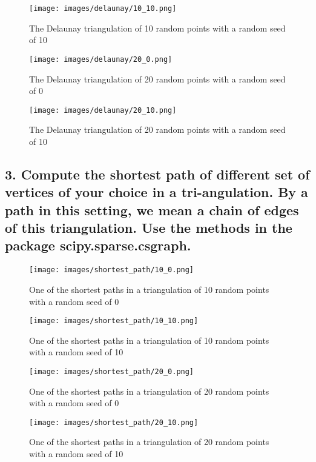 \documentclass[12pt]{article}
\newenvironment{matlab}
	{\begin{figure}[H]\centering\captionsetup{justification=centering}}
	{\end{figure}}
\begin{document}
\begin{matlab}
    \texttt{[image: images/delaunay/10\_10.png]}
    \caption{The Delaunay triangulation of 10 random points with a random seed of 10}
\end{matlab}

\begin{matlab}
    \texttt{[image: images/delaunay/20\_0.png]}
    \caption{The Delaunay triangulation of 20 random points with a random seed of 0}
\end{matlab}

\begin{matlab}
    \texttt{[image: images/delaunay/20\_10.png]}
    \caption{The Delaunay triangulation of 20 random points with a random seed of 10}
\end{matlab}

\pagebreak

\subsection*{3. Compute the shortest path of different set of vertices of your choice in a tri-angulation. By a path in this setting, we mean a chain of edges of this triangulation. Use the
methods in the package \textbf{scipy.sparse.csgraph}.}

\begin{matlab}
    \texttt{[image: images/shortest\_path/10\_0.png]}
    \caption{One of the shortest paths in a triangulation of 10 random points with a random seed of 0}
\end{matlab}

\begin{matlab}
    \texttt{[image: images/shortest\_path/10\_10.png]}
    \caption{One of the shortest paths in a triangulation of 10 random points with a random seed of 10}
\end{matlab}

\begin{matlab}
    \texttt{[image: images/shortest\_path/20\_0.png]}
    \caption{One of the shortest paths in a triangulation of 20 random points with a random seed of 0}
\end{matlab}

\begin{matlab}
    \texttt{[image: images/shortest\_path/20\_10.png]}
    \caption{One of the shortest paths in a triangulation of 20 random points with a random seed of 10}
\end{matlab}

\pagebreak
\end{document}

